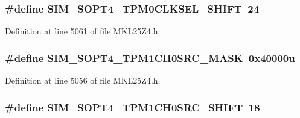 \subsubsection[{\texorpdfstring{S\+I\+M\+\_\+\+S\+O\+P\+T4\+\_\+\+T\+P\+M0\+C\+L\+K\+S\+E\+L\+\_\+\+S\+H\+I\+FT}{SIM_SOPT4_TPM0CLKSEL_SHIFT}}]{\setlength{\rightskip}{0pt plus 5cm}\#define S\+I\+M\+\_\+\+S\+O\+P\+T4\+\_\+\+T\+P\+M0\+C\+L\+K\+S\+E\+L\+\_\+\+S\+H\+I\+FT~24}\hypertarget{group___s_i_m___register___masks_ga608eeddec48cf22911d5f5a1ea52c261}{}\label{group___s_i_m___register___masks_ga608eeddec48cf22911d5f5a1ea52c261}


Definition at line 5061 of file M\+K\+L25\+Z4.\+h.

\subsubsection[{\texorpdfstring{S\+I\+M\+\_\+\+S\+O\+P\+T4\+\_\+\+T\+P\+M1\+C\+H0\+S\+R\+C\+\_\+\+M\+A\+SK}{SIM_SOPT4_TPM1CH0SRC_MASK}}]{\setlength{\rightskip}{0pt plus 5cm}\#define S\+I\+M\+\_\+\+S\+O\+P\+T4\+\_\+\+T\+P\+M1\+C\+H0\+S\+R\+C\+\_\+\+M\+A\+SK~0x40000u}\hypertarget{group___s_i_m___register___masks_ga9897da591b25b25a121a2321c5515923}{}\label{group___s_i_m___register___masks_ga9897da591b25b25a121a2321c5515923}


Definition at line 5056 of file M\+K\+L25\+Z4.\+h.

\subsubsection[{\texorpdfstring{S\+I\+M\+\_\+\+S\+O\+P\+T4\+\_\+\+T\+P\+M1\+C\+H0\+S\+R\+C\+\_\+\+S\+H\+I\+FT}{SIM_SOPT4_TPM1CH0SRC_SHIFT}}]{\setlength{\rightskip}{0pt plus 5cm}\#define S\+I\+M\+\_\+\+S\+O\+P\+T4\+\_\+\+T\+P\+M1\+C\+H0\+S\+R\+C\+\_\+\+S\+H\+I\+FT~18}\hypertarget{group___s_i_m___register___masks_ga79b1e63028e073fbe12351561f1b7645}{}\label{group___s_i_m___register___masks_ga79b1e63028e073fbe12351561f1b7645}


